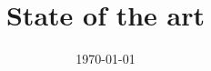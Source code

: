 \title{\vspace{1.5cm}State of the art \\ \vspace{0.25cm} \LARGE{\textbf{\projecttitle}}}
\author{}
\date{\today}